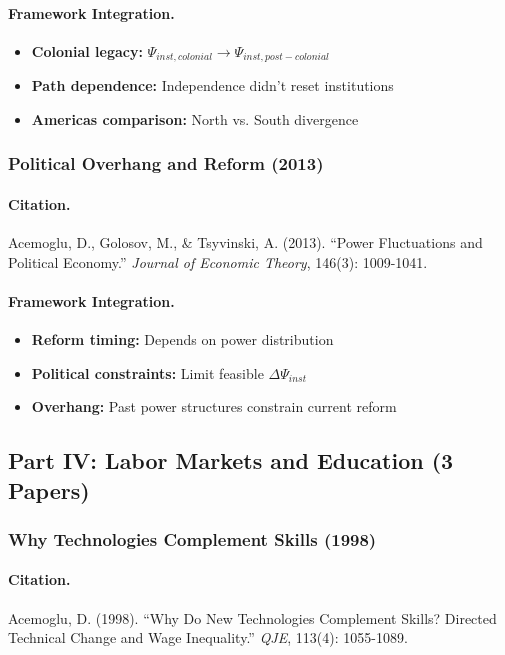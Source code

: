 \paragraph{Framework Integration.}
\begin{itemize}
  \item \textbf{Colonial legacy:} $\Psi_{inst,colonial} \to \Psi_{inst,post-colonial}$
  \item \textbf{Path dependence:} Independence didn't reset institutions
  \item \textbf{Americas comparison:} North vs. South divergence
\end{itemize}

\subsubsection{Political Overhang and Reform (2013)}

\paragraph{Citation.}
Acemoglu, D., Golosov, M., \& Tsyvinski, A. (2013).
``Power Fluctuations and Political Economy.''
\emph{Journal of Economic Theory}, 146(3): 1009-1041.

\paragraph{Framework Integration.}
\begin{itemize}
  \item \textbf{Reform timing:} Depends on power distribution
  \item \textbf{Political constraints:} Limit feasible $\Delta\Psi_{inst}$
  \item \textbf{Overhang:} Past power structures constrain current reform
\end{itemize}

\subsection{Part IV: Labor Markets and Education (3 Papers)}

\subsubsection{Why Technologies Complement Skills (1998)}

\paragraph{Citation.}
Acemoglu, D. (1998). ``Why Do New Technologies Complement Skills?
Directed Technical Change and Wage Inequality.'' \emph{QJE}, 113(4): 1055-1089.

